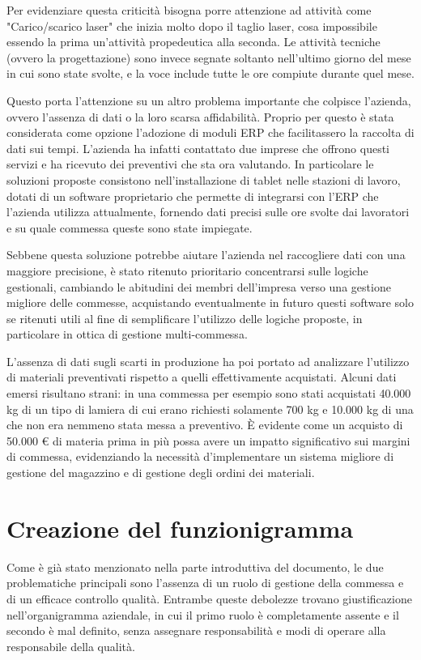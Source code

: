 \begin{multicols}{2}
	Per evidenziare questa criticità bisogna porre attenzione ad attività come "Carico/scarico laser" che inizia molto dopo il taglio laser, cosa impossibile essendo la prima un'attività propedeutica alla seconda. Le attività tecniche (ovvero la progettazione) sono invece segnate soltanto nell'ultimo giorno del mese in cui sono state svolte, e la voce include tutte le ore compiute durante quel mese.

	Questo porta l'attenzione su un altro problema importante che colpisce l'azienda, ovvero l'assenza di dati  o la loro scarsa affidabilità. Proprio per questo è stata considerata come opzione l'adozione di moduli ERP che facilitassero la raccolta di dati sui tempi. L'azienda ha infatti contattato due imprese che offrono questi servizi e ha ricevuto dei preventivi che sta ora valutando.
	In particolare le soluzioni proposte consistono nell'installazione di tablet nelle stazioni di lavoro, dotati di un software proprietario che permette di integrarsi con l'ERP che l'azienda utilizza attualmente, fornendo dati precisi sulle ore svolte dai lavoratori e su quale commessa queste sono state impiegate.

	Sebbene questa soluzione potrebbe aiutare l'azienda nel raccogliere dati con una maggiore precisione, è stato ritenuto prioritario concentrarsi sulle logiche gestionali, cambiando le abitudini dei membri dell'impresa verso una gestione migliore delle commesse, acquistando eventualmente in futuro questi software solo se ritenuti utili al fine di semplificare l'utilizzo delle logiche proposte, in particolare in ottica di gestione multi-commessa.

	L’assenza di dati sugli scarti in produzione ha poi portato ad analizzare l’utilizzo di materiali preventivati rispetto a quelli effettivamente acquistati. Alcuni dati emersi risultano strani: in una commessa per esempio sono stati acquistati 40.000 kg di un tipo di lamiera di cui erano richiesti solamente 700 kg e 10.000 kg di una che non era nemmeno stata messa a preventivo. È evidente come un acquisto di 50.000 € di materia prima in più possa avere un impatto significativo sui margini di commessa, evidenziando la necessità d'implementare un sistema migliore di gestione del magazzino e di gestione degli ordini dei materiali.


\section{Creazione del funzionigramma}
	Come è già stato menzionato nella parte introduttiva del documento, le due problematiche principali sono l’assenza di un ruolo di gestione della commessa e di un efficace controllo qualità. Entrambe queste debolezze trovano giustificazione nell’organigramma aziendale, in cui il primo ruolo è completamente assente e il secondo è mal definito, senza assegnare responsabilità e modi di operare alla responsabile della qualità.


\end{multicols}
